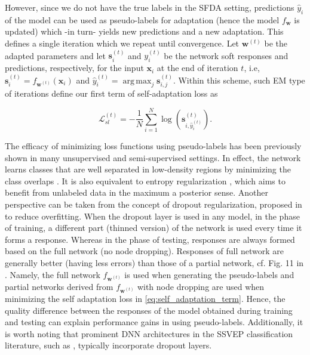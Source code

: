 \documentclass[12pt]{iopart}
\DeclareMathOperator*{\argmax}{arg\,max}
\newcommand{\matr}[1]{\mathbf{#1}}
\begin{document}
However, since we do not have the true labels in the SFDA setting, predictions $\hat{y}_i$ of the model can be used as pseudo-labels for adaptation (hence the model $f_\matr{w}$ is updated) which -in turn- yields new predictions and a new adaptation. This defines a single iteration which we repeat until convergence. Let $\matr{w}^{(t)}$ be the adapted parameters and let $\matr{s}_i^{(t)}$ and $y_i^{(t)}$ be the network soft responses and predictions, respectively, for the input $\matr{x}_i$ at the end of iteration $t$, i.e, $\matr{s}_i^{(t)} = f_{\matr{w}^{(t)}}(\matr{x}_i)$ and $\hat{y}_i^{(t)} = \argmax_j \matr{s}_{i,j}^{(t)}$. Within this scheme, such EM type of iterations define our first term of self-adaptation loss as

\begin{equation}
    \mathcal{L}_{sl}^{(t)} = -\frac{1}{N}\sum_{i=1}^{N} \log(\matr{s}_{i,\hat{y}_i^{(t)}}^{(t)}). \label{eq:self_adaptation_term}
\end{equation}


The efficacy of minimizing loss functions using pseudo-labels has been previously shown in many unsupervised \cite{cvpr_uda_pseudo} and semi-supervised \cite{pseudo_ssl,entropy_regularization,text_ssl_pseudo} settings. In effect, the network learns classes that are well separated in low-density regions by minimizing the class overlaps \cite{pseudo_ssl}. It is also equivalent to entropy regularization \cite{entropy_regularization}, which aims to benefit from unlabeled data in the maximum a posterior sense. Another perspective can be taken from the concept of dropout regularization, proposed in \cite{dropout_paper} to reduce overfitting. When the dropout layer is used in any model, in the phase of training, a different part (thinned version) of the network is used every time it forms a response. Whereas in the phase of testing, responses are always formed based on the full network (no node dropping). Responses of full network are generally better (having less errors) than those of a partial network, cf. Fig. 11 in \cite{dropout_paper}. {Namely, the full network $f_{\matr{w}^{(t)}}$ is used when generating the pseudo-labels and partial networks derived from $f_{\matr{w}^{(t)}}$ with node dropping are used when minimizing the self adaptation loss in \eqref{eq:self_adaptation_term}. Hence, the quality difference between the responses of the model obtained during training and testing can explain performance gains in using pseudo-labels. Additionally, it is worth noting that prominent DNN architectures in the SSVEP classification literature, such as \cite{ournetwork, ssvepformer}, typically incorporate dropout layers. }
\end{document}

